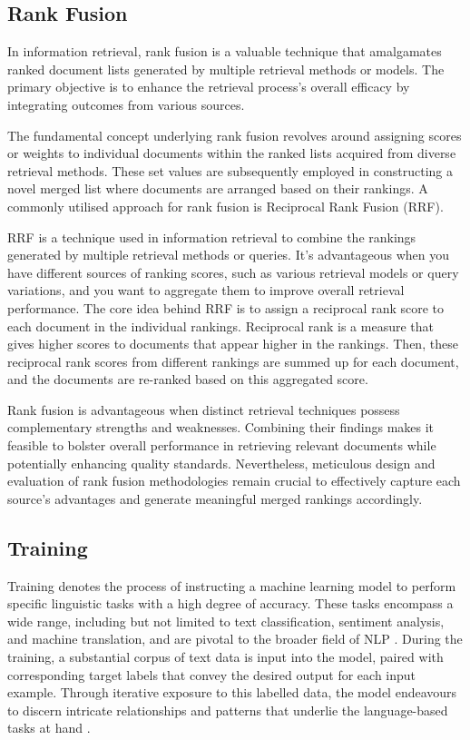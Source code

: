 \subsection{Rank Fusion}
In information retrieval, rank fusion is a valuable technique that amalgamates ranked document lists generated by multiple retrieval methods or models. The primary objective is to enhance the retrieval process's overall efficacy by integrating outcomes from various sources.

The fundamental concept underlying rank fusion revolves around assigning scores or weights to individual documents within the ranked lists acquired from diverse retrieval methods. These set values are subsequently employed in constructing a novel merged list where documents are arranged based on their rankings. A commonly utilised approach for rank fusion is Reciprocal Rank Fusion (RRF).

RRF is a technique used in information retrieval to combine the rankings generated by multiple retrieval methods or queries. It's advantageous when you have different sources of ranking scores, such as various retrieval models or query variations, and you want to aggregate them to improve overall retrieval performance. The core idea behind RRF is to assign a reciprocal rank score to each document in the individual rankings. Reciprocal rank is a measure that gives higher scores to documents that appear higher in the rankings. Then, these reciprocal rank scores from different rankings are summed up for each document, and the documents are re-ranked based on this aggregated score.

Rank fusion is advantageous when distinct retrieval techniques possess complementary strengths and weaknesses. Combining their findings makes it feasible to bolster overall performance in retrieving relevant documents while potentially enhancing quality standards. Nevertheless, meticulous design and evaluation of rank fusion methodologies remain crucial to effectively capture each source's advantages and generate meaningful merged rankings accordingly.

\subsection{Training}
Training denotes the process of instructing a machine learning model to perform specific linguistic tasks with a high degree of accuracy. These tasks encompass a wide range, including but not limited to text classification, sentiment analysis, and machine translation, and are pivotal to the broader field of NLP \cite{bert}. During the training, a substantial corpus of text data is input into the model, paired with corresponding target labels that convey the desired output for each input example. Through iterative exposure to this labelled data, the model endeavours to discern intricate relationships and patterns that underlie the language-based tasks at hand \cite{nlp}.

